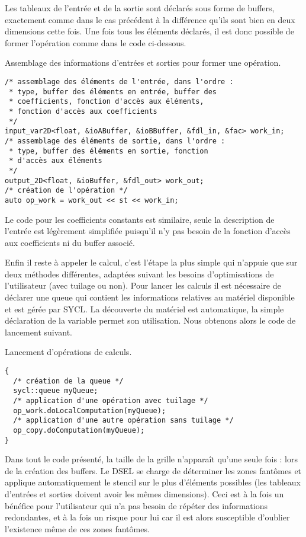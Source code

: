 Les tableaux de l'entrée et de la sortie sont déclarés sous forme de buffers, exactement comme dans le cas précédent à la différence qu'ils sont bien en deux dimensions cette fois. Une fois tous les éléments déclarés, il est donc possible de former l'opération comme dans le code ci-dessous.
\begin{listing}[H]
\caption{Assemblage des informations d'entrées et sorties pour former une opération.}
\label{lst:tab_io}
\begin{verbatim}
/* assemblage des éléments de l'entrée, dans l'ordre :
 * type, buffer des éléments en entrée, buffer des 
 * coefficients, fonction d'accès aux éléments,
 * fonction d'accès aux coefficients
 */
input_var2D<float, &ioABuffer, &ioBBuffer, &fdl_in, &fac> work_in;
/* assemblage des éléments de sortie, dans l'ordre :
 * type, buffer des éléments en sortie, fonction
 * d'accès aux éléments
 */
output_2D<float, &ioBuffer, &fdl_out> work_out;
/* création de l'opération */
auto op_work = work_out << st << work_in;
\end{verbatim}
\end{listing}
Le code pour les coefficients constants est similaire, seule la description de l'entrée est légèrement simplifiée puisqu'il n'y pas besoin de la fonction d'accès aux coefficients ni du buffer associé. 

Enfin il reste à appeler le calcul, c'est l'étape la plus simple qui n'appuie que sur deux méthodes différentes, adaptées suivant les besoins d'optimisations de l'utilisateur (avec tuilage ou non). Pour lancer les calculs il est nécessaire de déclarer une queue qui contient les informations relatives au matériel disponible et est gérée par \textsf{SYCL}. La découverte du matériel est automatique, la simple déclaration de la variable permet son utilisation. Nous obtenons alors le code de lancement suivant.
\begin{listing}[H]
\caption{Lancement d'opérations de calculs.}
\begin{verbatim}
{   
  /* création de la queue */
  sycl::queue myQueue; 
  /* application d'une opération avec tuilage */
  op_work.doLocalComputation(myQueue);
  /* application d'une autre opération sans tuilage */
  op_copy.doComputation(myQueue);
}
\end{verbatim}
\end{listing}

Dans tout le code présenté, la taille de la grille n'apparaît qu'une seule fois : lors de la création des buffers. Le DSEL se charge de déterminer les zones fantômes et applique automatiquement le stencil sur le plus d'éléments possibles (les tableaux d'entrées et sorties doivent avoir les mêmes dimensions). Ceci est à la fois un bénéfice pour l'utilisateur qui n'a pas besoin de répéter des informations redondantes, et à la fois un risque pour lui car il est alors susceptible d'oublier l'existence même de ces zones fantômes. 

